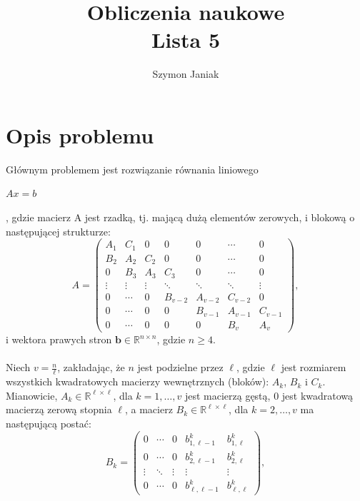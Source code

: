 \documentclass{article}
\title{%
	Obliczenia naukowe \\
	\large Lista 5}
\author{Szymon Janiak}
\begin{document}
\maketitle

\section*{Opis problemu}
	Głównym problemem jest rozwiązanie równania liniowego\\
	\centerline{$Ax = b$},
	gdzie macierz A jest rzadką, tj. mającą dużą elementów zerowych, i blokową o następującej strukturze:\\
	\[
	A = \begin{pmatrix}
		A_1 & C_1 & 0   & 0   & 0   & \cdots & 0 \\
		B_2 & A_2 & C_2 & 0   & 0   & \cdots & 0 \\
		0   & B_3 & A_3 & C_3 & 0   & \cdots & 0 \\
		\vdots & \vdots & \vdots & \ddots & \ddots & \ddots & \vdots \\
		0   & \cdots & 0   & B_{v-2} & A_{v-2} & C_{v-2} & 0 \\
		0   & \cdots & 0   & 0   & B_{v-1} & A_{v-1} & C_{v-1} \\
		0   & \cdots & 0   & 0   & 0   & B_v & A_v
		\end{pmatrix},
	\]
	i wektora prawych stron $\mathbf{b} \in \mathbb{R}^{n \times n}$, gdzie $n \geq 4$.\\
	\\
	Niech $v = \frac{n}{\ell}$, zakładając, że $n$ jest podzielne przez $\ell$, gdzie $\ell$ jest rozmiarem wszystkich kwadratowych macierzy wewnętrznych (bloków): $A_k$, $B_k$ i $C_k$. Mianowicie, $A_k \in \mathbb{R}^{\ell \times \ell}$, dla $k = 1, \ldots, v$ jest macierzą gęstą, $0$ jest kwadratową macierzą zerową stopnia $\ell$, a macierz $B_k \in \mathbb{R}^{\ell \times \ell}$, dla $k = 2, \ldots, v$ ma następującą postać:\\
	\[
	B_k = \begin{pmatrix}
		0 & \cdots & 0 & b^k_{1, \ell-1} & b^k_{1, \ell} \\
		0 & \cdots & 0 & b^k_{2, \ell-1} & b^k_{2, \ell} \\
		\vdots & \ddots & \vdots & \vdots & \vdots \\
		0 & \cdots & 0 & b^k_{\ell, \ell-1} & b^k_{\ell, \ell}
		\end{pmatrix},
	\]\\
\end{document}
